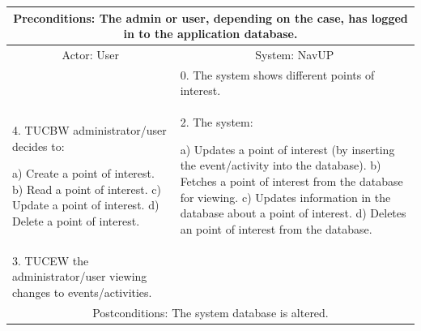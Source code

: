 \documentclass{article}
\begin{document}
       		 \begin{tabular}{|p{6cm}|p{6cm}|}
       		 \hline
       		 \multicolumn{2}{c}{\parbox{12cm}{\vspace{2mm}Preconditions: The admin or user, depending on the case, has logged in to the application database.\vspace{2mm}}} \\
       		 \hline
       		\multicolumn{1}{c}{Actor: User} & \multicolumn{1}{c}{ System: NavUP} \\
        		\hline
       		 & 0.	The system shows different points of interest.\\
       		 \hline
       		4.	TUCBW administrator/user decides to:

a)	Create a point of interest.
b)	Read a point of interest.
c)	Update a point of interest.
d)	Delete a point of interest.

 				&2.	The system:

a)	Updates a point of interest (by inserting the event/activity into the database).
b)	Fetches a point of interest from the database for viewing.
c)	Updates information in the database about a point of interest.
d)	Deletes an point of interest from the database.
\\
        		\hline
       		 	3.	TUCEW the administrator/user viewing changes to events/activities. &\\
       		 \hline
        		\multicolumn{2}{c}{Postconditions: The system database is altered.} \\
        		\hline
        \end{tabular} 
       
\end{document}
